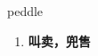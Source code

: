 
\begin{frame}
{\huge peddle}
\begin{center}
\begin{enumerate}\Large
  \item \textbf{叫卖，兜售}
\end{enumerate}
\end{center}
\end{frame}
